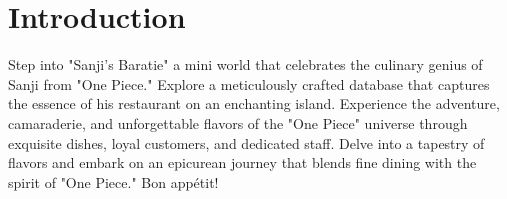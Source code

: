 \section{Introduction} \label{cap:intro}

Step into "Sanji's Baratie" a mini world that celebrates the culinary genius of Sanji from "One Piece." Explore a meticulously crafted database that captures the essence of his restaurant on an enchanting island. Experience the adventure, camaraderie, and unforgettable flavors of the "One Piece" universe through exquisite dishes, loyal customers, and dedicated staff. Delve into a tapestry of flavors and embark on an epicurean journey that blends fine dining with the spirit of "One Piece." Bon appétit!

